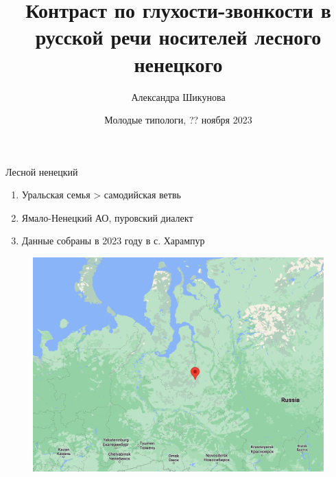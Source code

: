 \documentclass[10 pt, handout]{beamer}
\title{Контраст по глухости-звонкости в русской речи носителей лесного ненецкого}
\author{Александра Шикунова}
\institute{НИУ ВШЭ (Москва)}
\date{Молодые типологи, ?? ноября 2023}
\begin{document}
\begin{frame}
\titlepage
\end{frame}



\begin{frame}{Лесной ненецкий}

	\begin{enumerate}[$\gg$]
		\item Уральская семья > самодийская ветвь
		\item Ямало-Ненецкий АО, пуровский диалект
		\item Данные собраны в 2023 году в с. Харампур
	\end{enumerate}
	
	\begin{figure}[H]
		\includegraphics[width=.65\textwidth]{map}
	\end{figure}

\end{frame}
\end{document}
